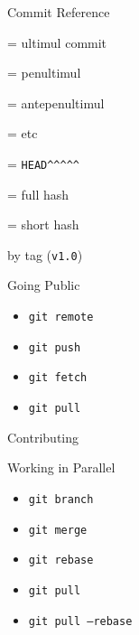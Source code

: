 \documentclass{beamer}
\begin{document}
\begin{frame}{Commit Reference}
  \begin{description}
    \item[\texttt{HEAD}] = ultimul commit
    \item[\texttt{HEAD\textasciicircum}] = penultimul
    \item[\texttt{HEAD\textasciicircum\textasciicircum}] = antepenultimul
    \item[...] = etc
    \pause
    \item[\texttt{HEAD\textasciitilde5}] = \texttt{HEAD\textasciicircum\textasciicircum\textasciicircum\textasciicircum\textasciicircum}
    \pause
    \item[a946e644d5b4c26aaa4e73338805e207bbfd78b0] = full hash
    \item[a946e6] = short hash
    \pause
    \item by tag (\texttt{v1.0})
  \end{description}
\end{frame}

\begin{frame}{Going Public}
  \begin{itemize}
    \item \texttt{git remote}
    \item \texttt{git push}
    \item \texttt{git fetch}
    \item \texttt{git pull}
  \end{itemize}
\end{frame}

\begin{frame}{Contributing}
\end{frame}

\begin{frame}{Working in Parallel}
  \vspace{-2cm}\hspace{5cm}
  \hspace{-5cm}\vspace{-6cm}
  \begin{itemize}
    \item \texttt{git branch}
    \item \texttt{git merge}
    \item \texttt{git rebase}
    \pause
    \item \texttt{git pull}
    \item \texttt{git pull --rebase}
  \end{itemize}
  \vspace{-3cm}\hspace{5cm}
\end{frame}
\end{document}
